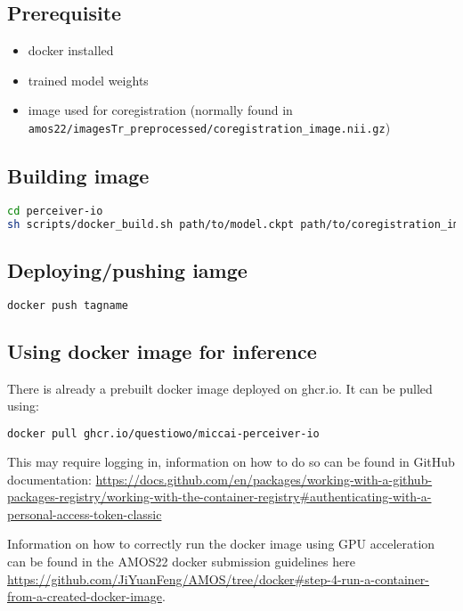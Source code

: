 \subsection{Prerequisite}

\begin{itemize}
  \item{docker installed}
  \item{trained model weights}
  \item{image used for coregistration (normally found in \\ \lstinline{amos22/imagesTr_preprocessed/coregistration_image.nii.gz})}
\end{itemize}

\subsection{Building image}

\begin{lstlisting}[language=bash]
cd perceiver-io
sh scripts/docker_build.sh path/to/model.ckpt path/to/coregistration_image.nii.gz tagname
\end{lstlisting}

\subsection{Deploying/pushing iamge}

\begin{lstlisting}[language=bash]
docker push tagname
\end{lstlisting}

\subsection{Using docker image for inference}

There is already a prebuilt docker image deployed on ghcr.io. It can be pulled using:

\begin{lstlisting}[language=bash]
docker pull ghcr.io/questiowo/miccai-perceiver-io
\end{lstlisting}

This may require logging in, information on how to do so can be found in GitHub documentation: \url{https://docs.github.com/en/packages/working-with-a-github-packages-registry/working-with-the-container-registry#authenticating-with-a-personal-access-token-classic}

Information on how to correctly run the docker image using GPU acceleration can be found in the AMOS22 docker submission guidelines here \url{https://github.com/JiYuanFeng/AMOS/tree/docker#step-4-run-a-container-from-a-created-docker-image}.

